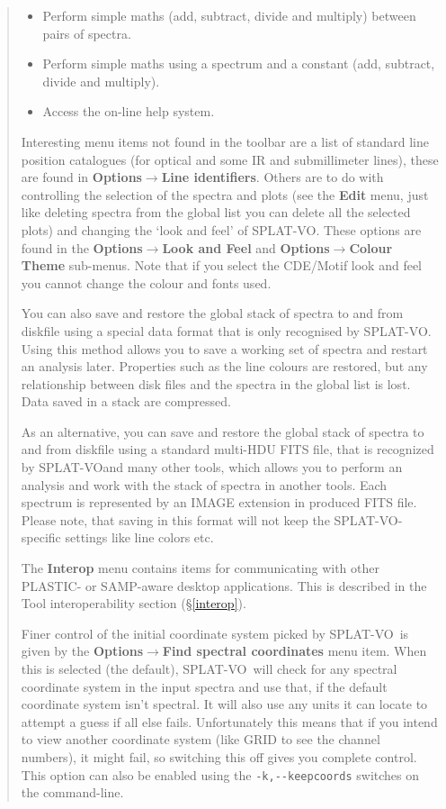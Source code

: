 \documentclass[twoside,11pt]{article}
\newcommand{\htmladdimg}[1]{}
\newcommand{\htmlref}[2]{#1}
\newcommand{\latex}[1]{#1}
\newcommand{\latexhtml}[2]{#1}
\renewcommand{\_}{\texttt{\symbol{95}}}
\newcommand{\SPLAT}{\textsf{SPLAT-VO}}
\newcommand{\inline}[1]
        {\latexhtml{\texttt{[image: sun243\_figures/\#1]}}
        {\htmladdimg[align=center]{#1.gif}}}
\newcommand{\menuitem}[1]{\textbf{#1}}
\newcommand{\submenuitem}[2]{\latexhtml{\textbf{#1$\rightarrow$#2}}{\textbf{#1->#2}}}
\begin{document}
\begin{quote}
\begin{itemize}
  \item[\inline{binarymath}] Perform simple maths (add, subtract, divide
  and multiply) between pairs of spectra.

  \item[\inline{unarymaths}] Perform simple maths using a spectrum and a
  constant (add, subtract, divide and multiply).

  \item[\inline{help}] Access the on-line help system.

\end{itemize}

 Interesting menu items not found in the toolbar are a list of standard line
 position catalogues (for optical and some IR and submillimeter lines), these
 are found in \submenuitem{Options}{Line identifiers}.  Others are to do with
 controlling the selection of the spectra and plots (see the \menuitem{Edit}
 menu, just like deleting spectra from the global list you can delete all the
 selected plots) and changing the `look and feel' of \SPLAT. These options are
 found in the \submenuitem{Options}{Look and Feel} and
 \submenuitem{Options}{Colour Theme} sub-menus. Note that if you select the
 CDE/Motif look and feel you cannot change the colour and fonts used.

 You can also save and restore the global stack of spectra to and from
 diskfile using a special data format that is only recognised by \SPLAT.
 Using this method allows you to save a working set of spectra and restart an
 analysis later. Properties such as the line colours are restored, but any
 relationship between disk files and the spectra in the global list is
 lost. Data saved in a stack are compressed.

 As an alternative, you can save and restore the global stack of spectra
 to and from diskfile using a standard multi-HDU FITS file, that is recognized
 by \SPLAT and many other tools, which allows you to perform an analysis
 and work with the stack of spectra in another tools. Each spectrum is represented
 by an IMAGE extension in produced FITS file. Please note, that saving in
 this format will not keep the \SPLAT -specific settings like line colors etc.

 The \menuitem{Interop} menu contains items for communicating with other
 PLASTIC- or SAMP-aware desktop applications. This is described in the
 \htmlref{Tool interoperability}{interop} section
 \latex{(\S\ref{interop})}.

 Finer control of the initial coordinate system picked by \SPLAT\ is given by
 the \submenuitem{Options}{Find spectral coordinates} menu item.  When this is
 selected (the default), \SPLAT\ will check for any spectral coordinate system
 in the input spectra and use that, if the default coordinate system isn't
 spectral. It will also use any units it can locate to attempt a guess if all
 else fails. Unfortunately this means that if you intend to view another
 coordinate system (like GRID to see the channel numbers), it might fail, so
 switching this off gives you complete control. This option can also be
 enabled using the \verb+-k,--keepcoords+ switches on the command-line.


\end{quote}
\end{document}
